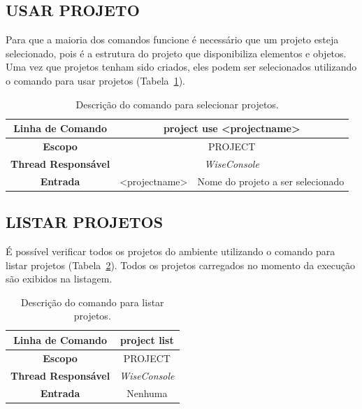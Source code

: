 \subsection{USAR PROJETO}\label{sec:use_projects}

Para que a maioria dos comandos funcione é necessário que um projeto esteja selecionado, pois é a estrutura do projeto que disponibiliza elementos e objetos. Uma vez que projetos tenham sido criados, eles podem ser selecionados utilizando o comando para usar projetos (Tabela~\ref{tab:use_project}).

\begin{center}
	\begin{table}[!htbp]
		\begin{tabularx}{\textwidth}{c|c|X}
			\toprule
			\textbf{Linha de Comando} & \multicolumn{2}{c}{project use <project\underline{\space\space}name>} \\
			\midrule
			\textbf{Escopo} & \multicolumn{2}{c}{PROJECT} \\
			\hline
			\textbf{Thread Responsável} & \multicolumn{2}{c}{\textit{WiseConsole}} \\
			\hline
			\textbf{Entrada} & <project\underline{\space\space}name> & Nome do projeto a ser selecionado \\
			\bottomrule
		\end{tabularx}
		\caption{Descrição do comando para selecionar projetos.}
		\label{tab:use_project}
	\end{table}
\end{center}

\subsection{LISTAR PROJETOS}\label{sec:list_projects}

É possível verificar todos os projetos do ambiente utilizando o comando para listar projetos (Tabela~\ref{tab:list_project}). Todos os projetos carregados no momento da execução são exibidos na listagem.

\begin{center}
	\begin{table}[!htbp]
		\begin{tabularx}{\textwidth}{c|X}
			\toprule
			\textbf{Linha de Comando} & \multicolumn{1}{c}{project list} \\
			\midrule
			\textbf{Escopo} & \multicolumn{1}{c}{PROJECT} \\
			\hline
			\textbf{Thread Responsável} & \multicolumn{1}{c}{\textit{WiseConsole}} \\
			\hline
			\textbf{Entrada} & \multicolumn{1}{c}{Nenhuma} \\
			\bottomrule
		\end{tabularx}
		\caption{Descrição do comando para listar projetos.}
		\label{tab:list_project}
	\end{table}
\end{center}

